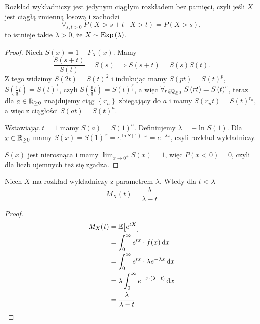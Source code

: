 \begin{theorem}
    Rozkład wykładniczy jest jedynym ciągłym rozkładem bez pamięci, czyli jeśli \(X\) jest ciągłą zmienną losową i zachodzi
    \[ \forall_{s,t>0} \ P\left( X> s+t \mid X>t \right) = P\left( X >s \right) ,  \] 
    to istnieje takie \(\lambda > 0\), że \(X \sim \operatorname{Exp}\left( \lambda \right) \).
\end{theorem}
\begin{proof}
    Niech \(S\left( x  \right) = 1 - F_X\left( x  \right) \). Mamy 
    \[ \frac{S\left( s+t \right) }{S\left( t \right) } = S\left( s  \right) \implies  S\left( s+t \right) = S\left( s  \right) S\left( t  \right) . \] 
    Z tego widzimy \(S \left( 2t \right) = S\left( t \right)^2 \) i indukując mamy \(S\left( p t  \right) = S\left( t  \right) ^{p}\), \( S\left( \frac{1}{q}t \right) = S\left( t  \right) ^{\frac{1}{q}} \), czyli \(S\left( \frac{p}{q}t \right) = S\left( t  \right) ^{\frac{p}{q}}\), a więc \(\forall_{r \in \mathbb{Q}_{\ge 0}} \ S\left( rt \right) = S\left( t  \right) ^{r} \), teraz dla \(a\in \mathbb{R}_{\ge 0}\) znajdujemy ciąg \(\left\{ r_n \right\} \) zbiegający do \(a\) i mamy \(S\left( r_n t  \right) = S\left( t  \right) ^{r_n}\), a więc z ciągłości \(S\left( at  \right) = S\left( t  \right) ^{a}\).

    Wstawiając \(t=1\) mamy \(S\left( a  \right) = S\left( 1 \right) ^{a}\). Definiujemy \(\lambda = -\ln S\left( 1 \right) \). Dla \(x \in \mathbb{R}_{\ge 0}\) mamy \(S\left( x  \right) = S\left( 1 \right) ^{x} = e^{\ln S\left( 1 \right) \cdot  x } = e^{-\lambda x}\), czyli rozkład wykładniczy.

    \(S\left( x  \right) \) jest nierosnąca i mamy \( \lim_{x \to 0^{+}} S\left( x  \right) = 1\), więc \(P\left( x < 0 \right) = 0\), czyli dla liczb ujemnych też się zgadza.
\end{proof}


\begin{theorem}[MGF] 
    Niech \( X \) ma rozkład wykładniczy z parametrem \( \lambda \). Wtedy dla \( t < \lambda \)
    \[
        M_X(t) = \frac{\lambda}{\lambda - t}
    \]
\end{theorem}
\begin{proof}
    \begin{align*}
        M_X(t) 
            &= \expected{e^{tX}} \\
            &= \int_0^\infty e^{tx} \cdot f(x) \diff x\\
            &= \int_0^\infty e^{tx} \cdot \lambda e^{-\lambda x} \diff x \\
            &= \lambda \int_0^\infty e^{-x \cdot (\lambda - t)} \diff x \\
            &= \frac{\lambda}{\lambda - t}
    \end{align*}
\end{proof}

